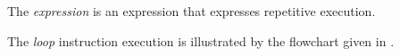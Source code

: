 The \emph{expression} is an  expression that expresses repetitive execution.

The \emph{loop} instruction execution is illustrated by the flowchart given in .

%    


